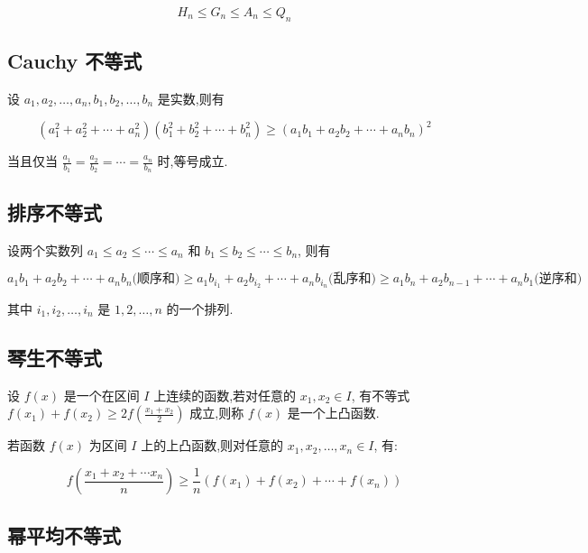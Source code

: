 \documentclass[a4paper , final]{ctexart}
\begin{document}
\begin{equation*}
  H_n \leq G_n \leq A_n \leq Q_n
\end{equation*}

\subsection*{Cauchy 不等式}

设 $a_1,a_2,\ldots,a_n,b_1,b_2,\ldots,b_n$ 是实数,则有

\begin{equation*}
  (a_1^2+a_2^2+\cdots+a_n^2)(b_1^2+b_2^2+\cdots+b_n^2) \geq (a_1b_1+a_2b_2+\cdots+a_nb_n)^2
\end{equation*}

当且仅当 $\frac{a_1}{b_1}=\frac{a_2}{b_2}=\cdots=\frac{a_n}{b_n}$ 时,等号成立.

\subsection*{排序不等式}

设两个实数列 $a_1 \leq a_2 \leq \cdots \leq a_n$ 和 $b_1 \leq b_2 \leq \cdots \leq b_n$, 则有

\begin{equation*}
  a_1b_1 + a_2b_2 + \cdots + a_nb_n\text{(顺序和)} \geq a_1b_{i_1} + a_2b_{i_2} + \cdots + a_nb_{i_n}\text{(乱序和)} \geq a_1b_n + a_2b_{n-1} + \cdots + a_nb_1\text{(逆序和)}
\end{equation*}

其中 $i_1,i_2,\ldots,i_n$ 是 $1,2,\ldots,n$ 的一个排列.

\subsection*{琴生不等式}

设 $f(x)$ 是一个在区间 $I$ 上连续的函数,若对任意的 $x_1,x_2\in I$, 有不等式 $f(x_1) + f(x_2) \geq 2f\left(\frac{x_1+x_2}{2}\right)$ 成立,则称 $f(x)$ 是一个上凸函数.

若函数 $f(x)$ 为区间 $I$ 上的上凸函数,则对任意的 $x_1,x_2,\ldots,x_n\in I$, 有:

\begin{equation*}
  f(\frac{x_1+x_2+\cdots x_n}{n})\geq \frac{1}{n}(f(x_1)+f(x_2)+\cdots+f(x_n))
\end{equation*}

\subsection*{幂平均不等式}
\end{document}
